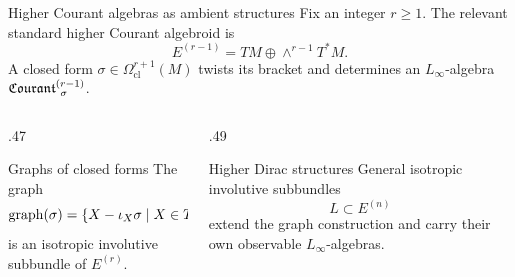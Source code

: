 \documentclass[beamer,10pt]{standalone}
\begin{document}
\begin{frame}{Higher Courant algebras as ambient structures}
  Fix an integer $r\geq 1$. The relevant standard higher Courant algebroid is
  \[
    E^{(r-1)}=TM\oplus\wedge^{r-1}T^*M.
  \]
  A closed form $\sigma\in\Omega^{r+1}_{\mathrm{cl}}(M)$ twists its bracket and
  determines an $L_\infty$-algebra $\Courant[\sigma]{r-1}$.

  \vfill\pause
  \begin{columns}[T]
    \begin{column}{.47\textwidth}
      \begin{block}{Graphs of closed forms}
        The graph
        \[
          \graph(\sigma)=
          \{X-\iota_X\sigma\mid X\in TM\}
        \]
        is an isotropic involutive subbundle of $E^{(r)}$.
      \end{block}
    \end{column}
    \begin{column}{.49\textwidth}
      \begin{block}{Higher Dirac structures}
        General isotropic involutive subbundles
        \[
          L\subset E^{(n)}
        \]
        extend the graph construction and carry their own observable
        $L_\infty$-algebras.
      \end{block}
    \end{column}
  \end{columns}
\end{frame}
\end{document}
